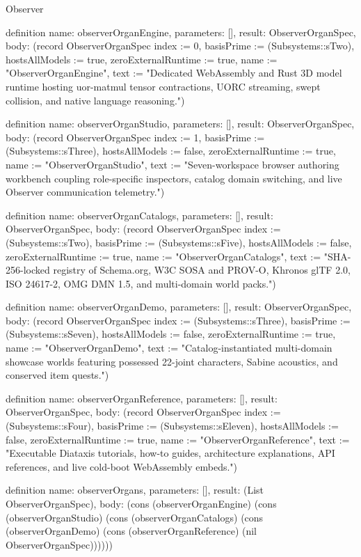 \begin{lexlean}{Observer}
\begin{semanticmodule}
definition{
  name: observerOrganEngine,
  parameters: [],
  result: ObserverOrganSpec,
  body: (record ObserverOrganSpec {index := 0, basisPrime := (Subsystems::sTwo), hostsAllModels := true, zeroExternalRuntime := true, name := "ObserverOrganEngine", text := "Dedicated WebAssembly and Rust 3D model runtime hosting uor-matmul tensor contractions, UORC streaming, swept collision, and native language reasoning."})
}

definition{
  name: observerOrganStudio,
  parameters: [],
  result: ObserverOrganSpec,
  body: (record ObserverOrganSpec {index := 1, basisPrime := (Subsystems::sThree), hostsAllModels := false, zeroExternalRuntime := true, name := "ObserverOrganStudio", text := "Seven-workspace browser authoring workbench coupling role-specific inspectors, catalog domain switching, and live Observer communication telemetry."})
}

definition{
  name: observerOrganCatalogs,
  parameters: [],
  result: ObserverOrganSpec,
  body: (record ObserverOrganSpec {index := (Subsystems::sTwo), basisPrime := (Subsystems::sFive), hostsAllModels := false, zeroExternalRuntime := true, name := "ObserverOrganCatalogs", text := "SHA-256-locked registry of Schema.org, W3C SOSA and PROV-O, Khronos glTF 2.0, ISO 24617-2, OMG DMN 1.5, and multi-domain world packs."})
}

definition{
  name: observerOrganDemo,
  parameters: [],
  result: ObserverOrganSpec,
  body: (record ObserverOrganSpec {index := (Subsystems::sThree), basisPrime := (Subsystems::sSeven), hostsAllModels := false, zeroExternalRuntime := true, name := "ObserverOrganDemo", text := "Catalog-instantiated multi-domain showcase worlds featuring possessed 22-joint characters, Sabine acoustics, and conserved item quests."})
}

definition{
  name: observerOrganReference,
  parameters: [],
  result: ObserverOrganSpec,
  body: (record ObserverOrganSpec {index := (Subsystems::sFour), basisPrime := (Subsystems::sEleven), hostsAllModels := false, zeroExternalRuntime := true, name := "ObserverOrganReference", text := "Executable Diataxis tutorials, how-to guides, architecture explanations, API references, and live cold-boot WebAssembly embeds."})
}

definition{
  name: observerOrgans,
  parameters: [],
  result: (List ObserverOrganSpec),
  body: (cons (observerOrganEngine) (cons (observerOrganStudio) (cons (observerOrganCatalogs) (cons (observerOrganDemo) (cons (observerOrganReference) (nil ObserverOrganSpec))))))
}


\end{semanticmodule}
\end{lexlean}
